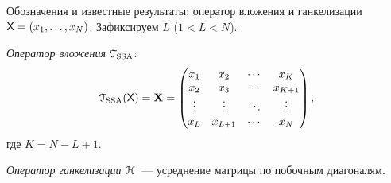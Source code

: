 \documentclass[notheorems, handout]{beamer}
\begin{document}
\begin{frame}{Обозначения и известные результаты: оператор вложения и ганкелизации}
	$\mathsf{X}=(x_1,\ldots,x_N)$. Зафиксируем $L$ ($1<L<N$).\medskip

	\emph{Оператор вложения} $\EuScript{T}_\text{SSA}$:
	\begin{equation*}
		\EuScript{T}_{\text{SSA}}(\mathsf{X})=\mathbf{X}=\begin{pmatrix}
			x_1    & x_2     & \cdots & x_K     \\
			x_2    & x_3     & \cdots & x_{K+1} \\
			\vdots & \vdots  & \ddots & \vdots  \\
			x_L    & x_{L+1} & \cdots & x_N
		\end{pmatrix},
	\end{equation*}
	где $K=N-L+1$.\medskip

	\emph{Оператор ганкелизации} $\EuScript{H}$~--- усреднение матрицы по побочным диагоналям.
\end{frame}
\end{document}
